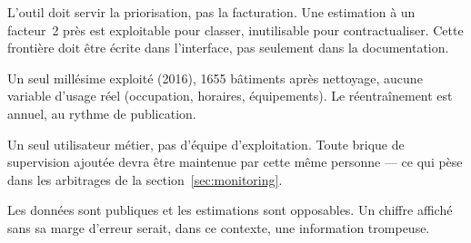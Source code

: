 \begin{description}[leftmargin=0em,style=nextline,itemsep=0.35em]
  \item[Métier] L'outil doit servir la priorisation, pas la facturation. Une
        estimation à un facteur~2 près est exploitable pour classer, inutilisable
        pour contractualiser. Cette frontière doit être écrite dans l'interface,
        pas seulement dans la documentation.
  \item[Données] Un seul millésime exploité (2016), \num{1655} bâtiments après
        nettoyage, aucune variable d'usage réel (occupation, horaires,
        équipements). Le réentraînement est annuel, au rythme de publication.
  \item[Opérationnelle] Un seul utilisateur métier, pas d'équipe d'exploitation.
        Toute brique de supervision ajoutée devra être maintenue par cette même
        personne — ce qui pèse dans les arbitrages de la section~\ref{sec:monitoring}.
  \item[Réglementaire] Les données sont publiques et les estimations sont
        opposables. Un chiffre affiché sans sa marge d'erreur serait, dans ce
        contexte, une information trompeuse.
\end{description}

\newpage
